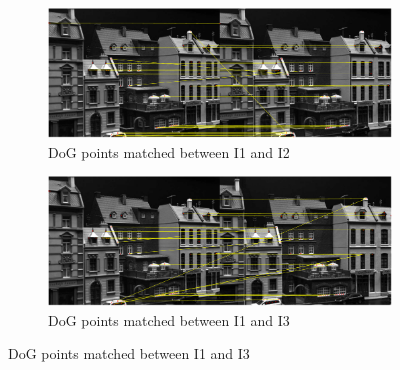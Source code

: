 \documentclass[11pt,a4paper]{article}
\begin{document}
\begin{figure}[H]
    \begin{subfigure}[t]{\textwidth}
        \includegraphics[width=\textwidth]{images/match_i1_i2_dog.pdf}
        \caption{DoG points matched between I1 and I2}
        \label{fig:i1_i2_dog}
    \end{subfigure}
    \begin{subfigure}[t]{\textwidth}
        \includegraphics[width=\textwidth]{images/match_i1_i3_dog.pdf}
        \caption{DoG points matched between I1 and I3}
        \label{fig:i1_i3_dog}
    \end{subfigure}
\end{figure}
\end{document}

